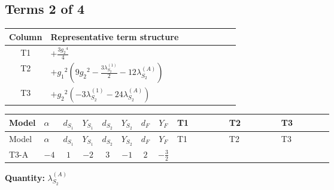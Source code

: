 \documentclass[8pt]{article}
\begin{document}
\begin{landscape}
\subsection*{Terms 2 of 4}
\begin{center}
\begin{tabular}{@{}c >{\raggedright\arraybackslash}p{0.82\linewidth}@{}}
\toprule
Column & Representative term structure \\
\midrule
T1 & \(\displaystyle +\frac{3 {g_2}^4}{4}\) \\
\midrule
T2 & \(\displaystyle +{g_1}^2 \left(9 {g_2}^2-\frac{3 {\lambda_{S_2}^{(1)}}}{2}-12 {\lambda_{S_2}^{(A)}}\right)\) \\
\midrule
T3 & \(\displaystyle +{g_2}^2 (-3 {\lambda_{S_2}^{(1)}}-24 {\lambda_{S_2}^{(A)}})\) \\
\midrule
\bottomrule
\end{tabular}
\end{center}
\smallskip
\tiny
\begin{longtable}{@{}llcccccc >{\raggedright\arraybackslash}p{0.21\linewidth} >{\raggedright\arraybackslash}p{0.21\linewidth} >{\raggedright\arraybackslash}p{0.21\linewidth}@{}}
\toprule
Model & $\alpha$ & $d_{S_1}$ & $Y_{S_1}$ & $d_{S_2}$ & $Y_{S_2}$ & $d_F$ & $Y_F$ & T1 & T2 & T3 \\
\midrule
\endfirsthead
\toprule
Model & $\alpha$ & $d_{S_1}$ & $Y_{S_1}$ & $d_{S_2}$ & $Y_{S_2}$ & $d_F$ & $Y_F$ & T1 & T2 & T3 \\
\midrule
\endhead
T3-A & $-4$ & $1$ & $-2$ & $3$ & $-1$ & $2$ & $-\frac{3}{2}$ & \scriptsize\adjustbox{max width=\linewidth}{$\begin{gathered} +\frac{3 {g_2}^4}{4}\end{gathered}$} & \scriptsize\adjustbox{max width=\linewidth}{$\begin{gathered} +{g_1}^2 \left(9 {g_2}^2-\frac{3 {\lambda_{S_2}^{(1)}}}{2}-12 {\lambda_{S_2}^{(A)}}\right)\end{gathered}$} & \scriptsize\adjustbox{max width=\linewidth}{$\begin{gathered} +{g_2}^2 (-3 {\lambda_{S_2}^{(1)}}-24 {\lambda_{S_2}^{(A)}})\end{gathered}$} \\
\midrule
\bottomrule
\end{longtable}
\clearpage
\noindent\textbf{Quantity: }$\lambda_{S_2}^{(A)}$\par\smallskip

\end{landscape}
\end{document}
